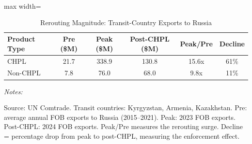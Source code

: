 \begin{table}[!h]
\centering
\caption{\label{tab:leakage}Rerouting Magnitude: Transit-Country Exports to Russia}
\centering
\begin{threeparttable}
\begin{adjustbox}{max width=\textwidth}
\begin{tabular}[t]{lccccc}
\toprule
Product Type & Pre (\$M) & Peak (\$M) & Post-CHPL (\$M) & Peak/Pre & Decline \\
\midrule
CHPL & 21.7 & 338.9 & 130.8 & 15.6x & 61\% \\
Non-CHPL & 7.8 & 76.0 & 68.0 & 9.8x & 11\% \\
\bottomrule
\end{tabular}
\end{adjustbox}
\begin{tablenotes}
\item \textit{Notes:}
\item Source: UN Comtrade. Transit countries: Kyrgyzstan, Armenia, Kazakhstan. Pre: average annual FOB exports to Russia (2015--2021). Peak: 2023 FOB exports. Post-CHPL: 2024 FOB exports. Peak/Pre measures the rerouting surge. Decline = percentage drop from peak to post-CHPL, measuring the enforcement effect.
\end{tablenotes}
\end{threeparttable}
\end{table}
